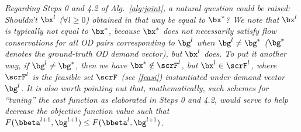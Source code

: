 \documentclass[3p]{elsarticle}
\begin{document}
	
\begin{rmk} \label{rmk:alg1} \em{Regarding Steps 0 and 4.2 of
    Alg.~\ref{alg:joint}, a natural question could be raised: Shouldn't
    $\bx^{l}$ ($\forall l \ge 0$) obtained in that way be equal to
    $\bx^*$? We note that $\bx^{l}$ is typically not equal to ${\bx^*}$,
    because ${\bx^*}$ does not necessarily satisfy flow conservations
    for all OD pairs corresponding to $\bg^{l}$ when $\bg^{l} \ne \bg^*$
    ($\bg^*$ denotes the ground-truth OD demand vector), but $\bx^{l}$
    does. To put it another way, if $\bg^{l} \ne \bg^*$, then we have
    $\bx^* \notin \scrF^l$, but $\bx^l \in \scrF^l$, where $\scrF^l$ is
    the feasible set $\scrF$ (see \eqref{feasi}) instantiated under
    demand vector $\bg^l$. It is also worth pointing out that,
    mathematically, such schemes for ``tuning'' the cost function as
    elaborated in Steps 0 and 4.2, would serve to help decrease the
    objective function value such that $F(\bbeta^{l+1},\bg^{l+1}) \le
    F(\bbeta^l,\bg^{l+1})$.}
\end{rmk}
	
\end{document}

